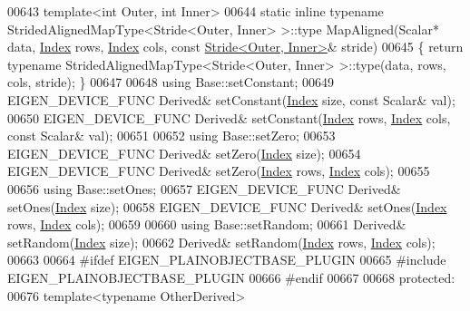 \begin{DoxyCode}
00643     \textcolor{keyword}{template}<\textcolor{keywordtype}{int} Outer, \textcolor{keywordtype}{int} Inner>
00644     \textcolor{keyword}{static} \textcolor{keyword}{inline} \textcolor{keyword}{typename} StridedAlignedMapType<Stride<Outer, Inner> >::type MapAligned(Scalar* data, 
      \hyperlink{namespace_eigen_a62e77e0933482dafde8fe197d9a2cfde}{Index} rows, \hyperlink{namespace_eigen_a62e77e0933482dafde8fe197d9a2cfde}{Index} cols, \textcolor{keyword}{const} \hyperlink{group___core___module_class_eigen_1_1_stride}{Stride<Outer, Inner>}& stride)
00645     \{ \textcolor{keywordflow}{return} \textcolor{keyword}{typename} StridedAlignedMapType<Stride<Outer, Inner> >::type(data, rows, cols, stride); \}
00647 
00648     \textcolor{keyword}{using} Base::setConstant;
00649     EIGEN\_DEVICE\_FUNC Derived& setConstant(\hyperlink{namespace_eigen_a62e77e0933482dafde8fe197d9a2cfde}{Index} size, \textcolor{keyword}{const} Scalar& val);
00650     EIGEN\_DEVICE\_FUNC Derived& setConstant(\hyperlink{namespace_eigen_a62e77e0933482dafde8fe197d9a2cfde}{Index} rows, \hyperlink{namespace_eigen_a62e77e0933482dafde8fe197d9a2cfde}{Index} cols, \textcolor{keyword}{const} Scalar& val);
00651 
00652     \textcolor{keyword}{using} Base::setZero;
00653     EIGEN\_DEVICE\_FUNC Derived& setZero(\hyperlink{namespace_eigen_a62e77e0933482dafde8fe197d9a2cfde}{Index} size);
00654     EIGEN\_DEVICE\_FUNC Derived& setZero(\hyperlink{namespace_eigen_a62e77e0933482dafde8fe197d9a2cfde}{Index} rows, \hyperlink{namespace_eigen_a62e77e0933482dafde8fe197d9a2cfde}{Index} cols);
00655 
00656     \textcolor{keyword}{using} Base::setOnes;
00657     EIGEN\_DEVICE\_FUNC Derived& setOnes(\hyperlink{namespace_eigen_a62e77e0933482dafde8fe197d9a2cfde}{Index} size);
00658     EIGEN\_DEVICE\_FUNC Derived& setOnes(\hyperlink{namespace_eigen_a62e77e0933482dafde8fe197d9a2cfde}{Index} rows, \hyperlink{namespace_eigen_a62e77e0933482dafde8fe197d9a2cfde}{Index} cols);
00659 
00660     \textcolor{keyword}{using} Base::setRandom;
00661     Derived& setRandom(\hyperlink{namespace_eigen_a62e77e0933482dafde8fe197d9a2cfde}{Index} size);
00662     Derived& setRandom(\hyperlink{namespace_eigen_a62e77e0933482dafde8fe197d9a2cfde}{Index} rows, \hyperlink{namespace_eigen_a62e77e0933482dafde8fe197d9a2cfde}{Index} cols);
00663 
00664 \textcolor{preprocessor}{    #ifdef EIGEN\_PLAINOBJECTBASE\_PLUGIN}
00665 \textcolor{preprocessor}{    #include EIGEN\_PLAINOBJECTBASE\_PLUGIN}
00666 \textcolor{preprocessor}{    #endif}
00667 
00668   \textcolor{keyword}{protected}:
00676     \textcolor{keyword}{template}<\textcolor{keyword}{typename} OtherDerived>

\end{DoxyCode}
